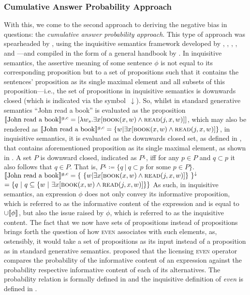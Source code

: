 \subsubsection{Cumulative Answer Probability Approach}
With this, we come to the second approach to deriving the negative bias in questions: the \textit{cumulative answer probability approach}. This type of approach was spearheaded by \textcite{Jeong2021,Jeong2022}, using the inquisitive semantics framework developed by \textcite{Ciardelli2009}, \textcite{Groenendijk2009}, \textcite{Mascarenhas2009}, \textcite{CiardelliRoelofsen2009}, and \textcite{GroenendijkRoelofsen2009}---and compiled in the form of a general handbook by \textcite{Ciardelli2019}. In inquisitive semantics, the assertive meaning of some sentence $\phi$ is not equal to its corresponding proposition but to a set of propositions such that it contains the sentences' proposition as its single maximal element and all subsets of this proposition---i.e., the set of propositions in inquisitive semantics is downwards closed (which is indicated via the symbol~$\downarrow$). So, whilst in standard generative semantics \enquote{John read a book} is evaluated as the proposition $\intension[g,c]{John read a book}=[\lambda{w_s}.\exists{x}[\predicate{book}(x,w)\land\predicate{read}(j,x,w)]]$, which may also be rendered as $\intension[g,c]{John read a book}=\{w|\exists{x}[\predicate{book}(x,w)\land\predicate{read}(j,x,w)]\}$, in inquisitive semantics, it is evaluated as the downwards closed set, as defined in , that contains aforementioned proposition as its single maximal element, as shown in .
\ex{}\label{def:downward-closed}
A set $P$ is downward closed, indicated as $P^\downarrow$, iff for any $p\in P$ and $q\subset p$ it also follows that $q\in P$. That is, $P^\downarrow\coloneqq\{q~|~q\subset p\text{ for some }p\in P\}$.
\xe
\ex{}
$\intension[g,c]{John read a book}=\{~\{w|\exists{x}[\predicate{book}(x,w)\land\predicate{read}(j,x,w)]\}~\}^\downarrow$\\
\hbox{}\hspace{114pt}$=\{q~|~q\subseteq \{w~|~\exists{x}[\predicate{book}(x,w)\land\predicate{read}(j,x,w)]\}\}$
\xe
As such, in inquisitive semantics, an expression $\phi$ does not only convey its informative proposition, which is referred to as the informative content of the expression and is equal to $\cup\intension[]{$\phi$}$, but also the issue raised by $\phi$, which is referred to as the inquisitive content. The fact that we now have sets of propositions instead of propositions brings forth the question of how {\scshape even} associates with such elements, as, ostensibly, it would take a set of propositions as its input instead of a proposition as in standard generative semantics. \textcite{Roelofsen2018} proposed that the licensing {\scshape even} operator compares the probability of the informative content of an expression against the probability respective informative content of each of its alternatives. The probability relation is formally defined in  and the inquisitive definition of \textit{even} is defined in .
